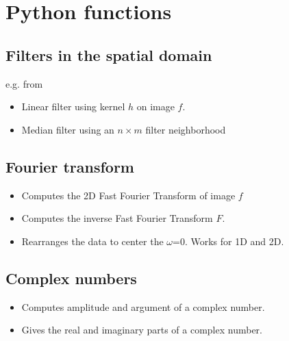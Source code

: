 \documentclass[letterpaper,10pt,english]{sphinxmanual}
\begin{document}
\section{Python functions}
\label{\detokenize{02-ImageEnhancement:python-functions}}

\subsection{Filters in the spatial domain}
\label{\detokenize{02-ImageEnhancement:filters-in-the-spatial-domain}}
\sphinxAtStartPar
e.g. from 
\begin{itemize}
\item {} 
\sphinxAtStartPar
{} Linear filter using kernel \(h\) on image \(f\).

\item {} 
\sphinxAtStartPar
{}  Median filter using an \(n \times m\) filter neighborhood

\end{itemize}


\subsection{Fourier transform}
\label{\detokenize{02-ImageEnhancement:fourier-transform}}\begin{itemize}
\item {} 
\sphinxAtStartPar
{} Computes the 2D Fast Fourier Transform of image \(f\)

\item {} 
\sphinxAtStartPar
{} Computes the inverse Fast Fourier Transform \(F\).

\item {} 
\sphinxAtStartPar
{} Rearranges the data to center the \(\omega\)=0. Works for 1D and 2D.

\end{itemize}


\subsection{Complex numbers}
\label{\detokenize{02-ImageEnhancement:complex-numbers}}\begin{itemize}
\item {} 
\sphinxAtStartPar
{} Computes amplitude and argument of a complex number.

\item {} 
\sphinxAtStartPar
{} Gives the real and imaginary parts of a complex number.

\end{itemize}
\end{document}
